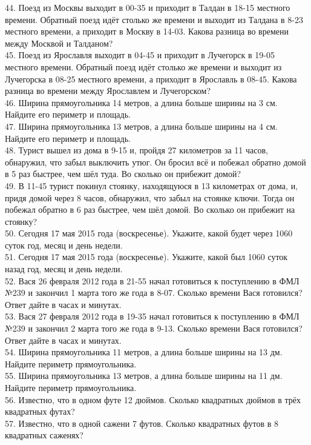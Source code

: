 44. Поезд из Москвы выходит в 00-35 и приходит в Талдан в 18-15 местного времени. Обратный поезд идёт столько же времени и выходит из Талдана в 8-23 местного времени, а приходит в Москву в 14-03. Какова разница во времени между Москвой и Талданом?\\
45. Поезд из Ярославля выходит в 04-45 и приходит в Лучегорск в 19-05 местного времени. Обратный поезд идёт столько же времени и выходит из Лучегорска в 08-25 местного времени, а приходит в Ярославль в 08-45. Какова разница во времени между Ярославлем и Лучегорском?\\
46. Ширина прямоугольника 14 метров, а длина больше ширины на 3 см. Найдите его периметр и площадь.\\
47. Ширина прямоугольника 13 метров, а длина больше ширины на 4 см. Найдите его периметр и площадь.\\
48. Турист вышел из дома в 9-15 и, пройдя 27 километров за 11 часов, обнаружил, что забыл выключить утюг. Он бросил всё и побежал обратно домой в 5 раз быстрее, чем шёл туда. Во сколько он прибежит домой?\\
49. В 11-45 турист покинул стоянку, находящуюся в 13 километрах от дома, и, придя домой через 8 часов, обнаружил, что забыл на стоянке ключи. Тогда он побежал обратно в 6 раз быстрее, чем шёл домой. Во сколько он прибежит на стоянку?\\
50. Сегодня 17 мая 2015 года (воскресенье). Укажите, какой будет через 1060 суток год, месяц и день недели.\\
51. Сегодня 17 мая 2015 года (воскресенье). Укажите, какой был 1060 суток назад год, месяц и день недели.\\
52. Вася 26 февраля 2012 года в 21-55 начал готовиться к поступлению в ФМЛ №239 и закончил 1 марта того же года в 8-07. Сколько времени Вася готовился? Ответ дайте в часах и минутах.\\
53. Вася 27 февраля 2012 года в 19-35 начал готовиться к поступлению в ФМЛ №239 и закончил 2 марта того же года в 9-13. Сколько времени Вася готовился? Ответ дайте в часах и минутах.\\
54. Ширина прямоугольника 11 метров, а длина больше ширины на 13 дм. Найдите периметр прямоугольника.\\
55. Ширина прямоугольника 13 метров, а длина больше ширины на 11 дм. Найдите периметр прямоугольника.\\
56. Известно, что в одном футе 12 дюймов. Сколько квадратных дюймов в трёх квадратных футах?\\
57. Известно, что в одной сажени 7 футов. Сколько квадратных футов в 8 квадратных саженях?\\
